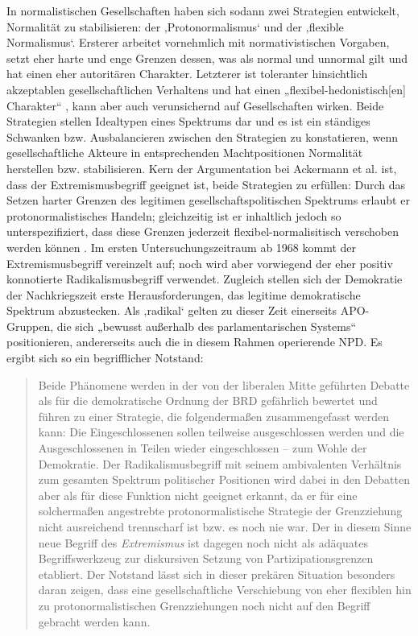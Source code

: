 In normalistischen Gesellschaften haben sich sodann zwei Strategien entwickelt, Normalität zu stabilisieren: der ‚Protonormalismus` und der ‚flexible Normalismus`. Ersterer arbeitet vornehmlich mit normativistischen Vorgaben, setzt eher harte und enge Grenzen dessen, was als normal und unnormal gilt und hat einen eher autoritären Charakter. Letzterer ist toleranter hinsichtlich akzeptablen gesellschaftlichen Verhaltens und hat einen „flexibel-hedonistisch{[}en{]} Charakter`` \autocite[85, Tabelle 1]{ackermannMetamorphosenExtremismusbegriffesDiskursanalytische2015}, kann aber auch verunsichernd auf Gesellschaften wirken. Beide Strategien stellen Idealtypen eines Spektrums dar und es ist ein ständiges Schwanken bzw. Ausbalancieren zwischen den Strategien zu konstatieren, wenn gesellschaftliche Akteure in entsprechenden Machtpositionen Normalität herstellen bzw. stabilisieren. Kern der Argumentation bei Ackermann et al. ist, dass der Extremismusbegriff geeignet ist, beide Strategien zu erfüllen: Durch das Setzen harter Grenzen des legitimen gesellschaftspolitischen Spektrums erlaubt er protonormalistisches Handeln; gleichzeitig ist er inhaltlich jedoch so unterspezifiziert, dass diese Grenzen jederzeit flexibel-normalisitisch verschoben werden können \autocite[86-87]{ackermannMetamorphosenExtremismusbegriffesDiskursanalytische2015}.
\largerpage
Im ersten Untersuchungszeitraum ab 1968 kommt der Extremismusbegriff vereinzelt auf; noch wird aber vorwiegend der eher positiv konnotierte Radikalismusbegriff verwendet. Zugleich stellen sich der Demokratie der Nachkriegszeit erste Herausforderungen, das legitime demokratische Spektrum abzustecken. Als ‚radikal` gelten zu dieser Zeit einerseits APO-Gruppen, die sich „bewusst außerhalb des parlamentarischen Systems`` \autocite[121]{ackermannMetamorphosenExtremismusbegriffesDiskursanalytische2015} positionieren, andererseits auch die in diesem Rahmen operierende NPD. Es ergibt sich so ein begrifflicher Notstand:

\begin{quote}
Beide Phänomene werden in der von der liberalen Mitte geführten Debatte als für die demokratische Ordnung der BRD gefährlich bewertet und führen zu einer Strategie, die folgendermaßen zusammengefasst werden kann: Die Eingeschlossenen sollen teilweise ausgeschlossen werden und die Ausgeschlossenen in Teilen wieder eingeschlossen -- zum Wohle der Demokratie. Der Radikalismusbegriff mit seinem ambivalenten Verhältnis zum gesamten Spektrum politischer Positionen wird dabei in den Debatten aber als für diese Funktion nicht geeignet erkannt, da er für eine solchermaßen angestrebte protonormalistische Strategie der Grenzziehung nicht ausreichend trennscharf ist bzw. es noch nie war. Der in diesem Sinne neue Begriff des \emph{Extremismus} ist dagegen noch nicht als adäquates Begriffswerkzeug zur diskursiven Setzung von Partizipationsgrenzen etabliert. Der Notstand lässt sich in dieser prekären Situation besonders daran zeigen, dass eine gesellschaftliche Verschiebung von eher flexiblen hin zu protonormalistischen Grenzziehungen noch nicht auf den Begriff gebracht werden kann. \autocite[121]{ackermannMetamorphosenExtremismusbegriffesDiskursanalytische2015}
\end{quote}

